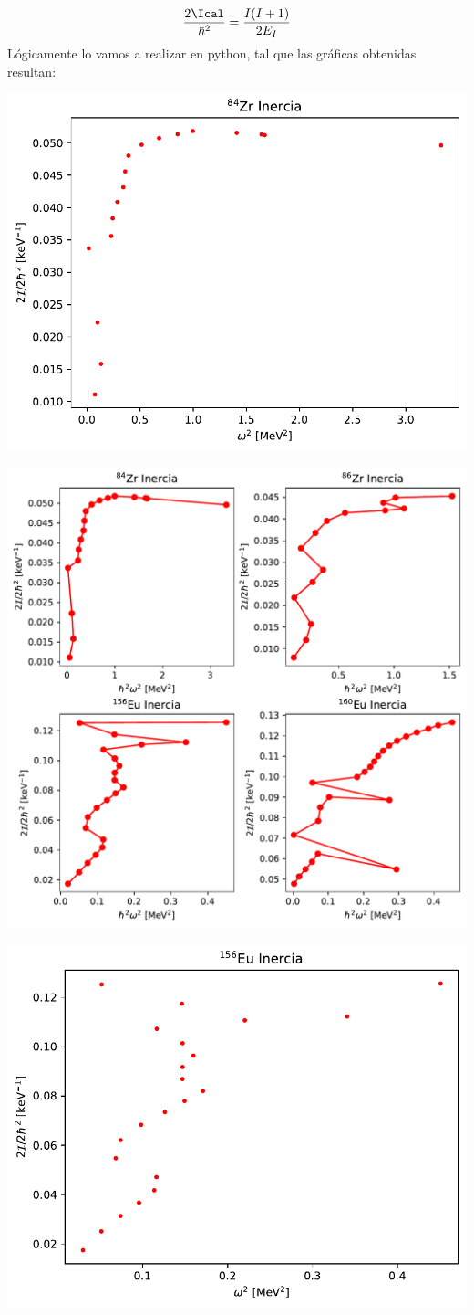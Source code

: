     \begin{equation}
       \frac{2\Ical}{\hbar^2} = \frac{I(I+1)}{2E_I}
    \end{equation}
    Lógicamente lo vamos a realizar en python, tal que las gráficas obtenidas resultan:

    \begin{center}
        \includegraphics[width=0.6\linewidth]{Cuerpo/Boletin_01/84Zr_inercia.pdf}
    \end{center}
    \begin{center}
        \includegraphics[width=0.6\linewidth]{Cuerpo/Boletin_01/86Zr_inercia.pdf}
    \end{center}
    \begin{center}
        \includegraphics[width=0.6\linewidth]{Cuerpo/Boletin_01/156Eu_inercia.pdf}
    \end{center}
